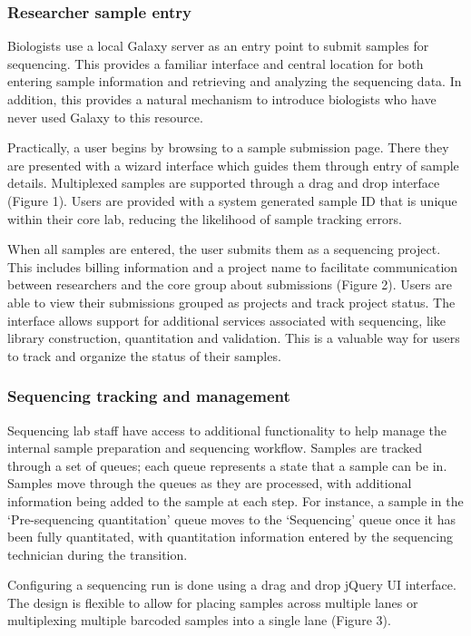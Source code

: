 \documentclass[10pt]{bmc_article}
\newenvironment{bmcformat}{\begin{raggedright}\baselineskip20pt\sloppy\setboolean{publ}{false}}{\end{raggedright}\baselineskip20pt\sloppy}
\begin{document}
\begin{bmcformat}
\subsubsection*{Researcher sample entry}

Biologists use a local Galaxy server as an entry point to submit
samples for sequencing. This provides a familiar interface and central
location for both entering sample information and retrieving and
analyzing the sequencing data. In addition, this provides a natural mechanism
to introduce biologists who have never used Galaxy to this resource.

Practically, a user begins by browsing to a sample submission
page. There they are presented with a wizard interface which guides
them through entry of sample details. Multiplexed samples are
supported through a drag and drop interface (Figure 1). Users are provided with
a system generated sample ID that is unique within their core lab, reducing the 
likelihood of sample tracking errors.

When all samples are entered, the user submits them as a sequencing
project. This includes billing information and a project name to
facilitate communication between researchers and the core group
about submissions (Figure 2). Users are able to view their submissions
grouped as projects and track project status. The interface
allows support for additional services associated with sequencing,
like library construction, quantitation and validation. This is a
valuable way for users to track and organize the status of their
samples.

\subsubsection*{Sequencing tracking and management}

Sequencing lab staff have access to additional
functionality to help manage the internal sample preparation and
sequencing workflow. Samples are tracked through
a set of queues; each queue represents a state that a sample can be
in. Samples move through the queues as they are processed, with
additional information being added to the sample at each step. For
instance, a sample in the ‘Pre-sequencing quantitation’ queue moves to
the ‘Sequencing’ queue once it has been fully quantitated, with
quantitation information entered by the sequencing technician during
the transition.

Configuring a sequencing run is done using a drag and drop jQuery UI
interface. The design is flexible to allow for placing samples across
multiple lanes or multiplexing multiple barcoded samples into a single
lane (Figure 3).


\end{bmcformat}
\end{document}
